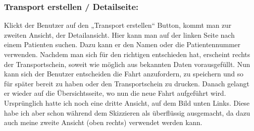 \documentclass[a4paper, ngerman, 12pt]{scrartcl}
\begin{document}
\subsubsection*{Transport erstellen / Detailseite:}
Klickt der Benutzer auf den „Transport erstellen“ Button, kommt man zur zweiten Ansicht, der Detailansicht. Hier kann man auf der linken Seite nach einem Patienten suchen. Dazu kann er den Namen oder die Patientennummer verwenden. Nachdem man sich für den richtigen entschieden hat, erscheint rechts der Transportschein, soweit wie möglich aus bekannten Daten vorausgefüllt. Nun kann sich der Benutzer entscheiden die Fahrt anzufordern, zu speichern und so für später bereit zu haben oder den Transportschein zu drucken. Danach gelangt er wieder auf die Übersichtsseite, wo nun die neue Fahrt aufgeführt wird.\\
Ursprünglich hatte ich noch eine dritte Ansicht, auf dem Bild unten Links. Diese habe ich aber schon während dem Skizzieren als überflüssig ausgemacht, da dazu auch meine zweite Ansicht (oben rechts) verwendet werden kann.
\end{document}
